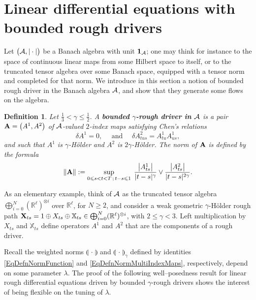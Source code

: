 \documentclass[11pt,a4paper]{amsart}
\newcommand{\RR}{\mathbb{R}}  \newcommand{\CC}{\mathbb{C}}  \newcommand{\LL}{\mathbb{L}}  \newcommand{\WW}{\mathbb{W}}
\newcommand{\bbX}{\mathbb{X}}
\renewcommand{\leq}{\leqslant}
\renewcommand{\geq}{\geqslant}
\newtheorem{defn}[thm]{ \hspace{-0.3cm} {\sc Definition}}%
\numberwithin{equation}{section} %
\begin{document}
\section{Linear differential equations with bounded rough drivers}
\label{SectionBoundedDrivers}

Let $\big(\mathcal{A},|\cdot|\big)$ be a Banach algebra with unit ${\bf 1}_{\mathcal{A}}$; one may think for instance to the space of continuous linear maps from some Hilbert space to itself, or to the truncated tensor algebra over some Banach space, equipped with a tensor norm and completed for that norm. We introduce in this section a notion of bounded rough driver in the Banach algebra $\mathcal{A}$, and show that they generate some flows on the algebra. 

\begin{defn}
Let $\frac{1}{3}<\gamma\leq \frac{1}{2}$. A \textbf{\emph{bounded $\gamma$-rough driver in $\mathcal{A}$}} is a pair ${\bf A}= \big(A^1,A^2\big)$ of $\mathcal{A}$-valued $2$-index maps satisfying \emph{Chen's relations}
\begin{equation}
\label{EqChenRelations}
\delta A^1=0, \quad \textrm{ and }\quad \delta A^2_{tus} = A^1_{tu}A^1_{us},
\end{equation}
and such that $A^1$ is $\gamma$-H\"older and $A^2$ is $2\gamma$-H\"older. The norm of $\bf A$ is defined by the formula
$$
\| {\bf A} \| := \sup_{0\leq s<t<T\,;\,t-s\leq 1}\;\frac{\big|A^1_{ts}\big|}{|t-s|^\gamma}\vee\frac{\big|A^2_{ts}\big|}{|t-s|^{2\gamma}}.
$$
\end{defn}

\medskip

As an elementary example, think of $\mathcal{A}$ as the truncated tensor algebra $\bigoplus_{i=0}^N(\RR^\ell)^{\otimes i}$ over $\RR^\ell$, for $N\geq 2$, and consider a weak geometric $\gamma$-H\"older rough path ${\bfX}_{ts} = 1\oplus X_{ts}\oplus \bbX_{ts}\in\bigoplus_{i=0}^N(\RR^\ell)^{\otimes i}$, with $2\leq \gamma<3$. Left multiplication by $X_{ts}$ and $\bbX_{ts}$ define operators $A^1$ and $A^2$ that are the components of a rough driver.

\medskip

Recall the weighted norms $\llparenthesis\,\cdot\,\rrparenthesis$ and $\llparenthesis\,\cdot\,\rrparenthesis_\gamma$ defined by identities \eqref{EqDefnNormFunction} and \eqref{EqDefnNormMultiIndexMaps}, respectively, depend on some parameter $\lambda$. The proof of the following well--posedness result for linear rough differential equations driven by bounded $\gamma$-rough drivers shows the interest of being flexible on the tuning of $\lambda$.
\end{document}
